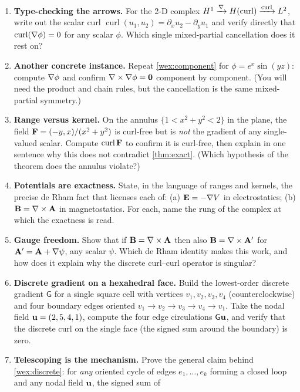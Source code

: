\exercisessection
\begin{enumerate}[nosep]
\item \textbf{Type-checking the arrows.} For the 2-D complex
  $H^1\xrightarrow{\nabla}H(\mathrm{curl})\xrightarrow{\operatorname{curl}}L^2$, write out the
  scalar curl $\operatorname{curl}(u_1,u_2)=\partial_x u_2-\partial_y u_1$ and verify
  directly that $\operatorname{curl}(\nabla\phi)=0$ for any scalar $\phi$. Which single
  mixed-partial cancellation does it rest on?
\item \textbf{Another concrete instance.} Repeat \cref{wex:component} for
  $\phi=e^{x}\sin(yz)$: compute $\nabla\phi$ and confirm $\nabla\times\nabla\phi=\mathbf 0$
  component by component. (You will need the product and chain rules, but the
  cancellation is the same mixed-partial symmetry.)
\item \textbf{Range versus kernel.} On the annulus $\{1<x^2+y^2<2\}$ in the plane, the
  field $\mathbf{F}=(-y,x)/(x^2+y^2)$ is curl-free but is \emph{not} the gradient of any
  single-valued scalar. Compute $\operatorname{curl}\mathbf{F}$ to confirm it is curl-free, then
  explain in one sentence why this does not contradict \cref{thm:exact}. (Which
  hypothesis of the theorem does the annulus violate?)
\item \textbf{Potentials are exactness.} State, in the language of ranges and kernels,
  the precise de Rham fact that licenses each of: (a) $\mathbf{E}=-\nabla V$ in electrostatics;
  (b) $\mathbf{B}=\nabla\times\mathbf{A}$ in magnetostatics. For each, name the rung of the complex at which
  the exactness is read.
\item \textbf{Gauge freedom.} Show that if $\mathbf{B}=\nabla\times\mathbf{A}$ then also $\mathbf{B}=\nabla\times\mathbf{A}'$ for
  $\mathbf{A}'=\mathbf{A}+\nabla\psi$, any scalar $\psi$. Which de Rham identity makes this work, and how
  does it explain why the discrete curl--curl operator is singular?
\item \textbf{Discrete gradient on a hexahedral face.} Build the lowest-order discrete
  gradient $\mathsf{G}$ for a single square cell with vertices
  $v_1,v_2,v_3,v_4$ (counterclockwise) and four boundary edges oriented
  $v_1\!\to\!v_2\!\to\!v_3\!\to\!v_4\!\to\!v_1$. Take the nodal field
  $\mathbf{u}=(2,5,4,1)$, compute the four edge circulations $\mathsf{G}\mathbf{u}$, and verify that
  the discrete curl on the single face (the signed sum around the boundary) is zero.
\item \textbf{Telescoping is the mechanism.} Prove the general claim behind
  \cref{wex:discrete}: for \emph{any} oriented cycle of edges
  $e_1,\dots,e_k$ forming a closed loop and any nodal field $\mathbf{u}$, the signed sum of

\end{enumerate}
